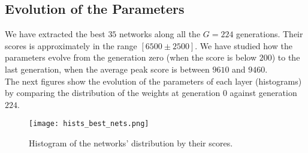 \documentclass[11pt]{scrartcl} %
\begin{document}
\subsection{Evolution of the Parameters}

We have extracted the best $35$ networks along all the $G=224$ generations. Their scores is approximately in the range $[6500 \pm 2500]$. We have studied how the parameters evolve from the generation zero (when the score is below $200$) to the last generation, when the average peak score is between $9610$ and $9460$. \\
The next figures show the evolution of the parameters of each layer (histograms) by comparing the distribution of the weights at generation $0$ against generation $224$.

\begin{figure}[h] %
	\centering
	\texttt{[image: hists\_best\_nets.png]} %
	\caption{ Histogram of the networks' distribution by their scores.}
\end{figure}
\end{document}
